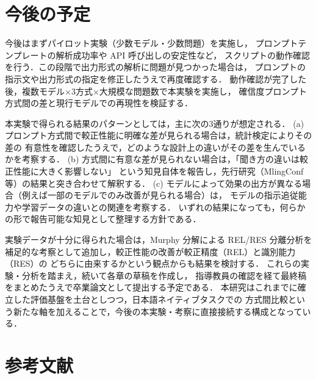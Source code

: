 \documentclass[10pt,a4paper,twocolumn]{article}
\begin{document}
\section{今後の予定}

今後はまずパイロット実験（少数モデル・少数問題）を実施し，
プロンプトテンプレートの解析成功率や API 呼び出しの安定性など，
スクリプトの動作確認を行う．この段階で出力形式の解析に問題が見つかった場合は，
プロンプトの指示文や出力形式の指定を修正したうえで再度確認する．
動作確認が完了した後，複数モデル×3方式×大規模な問題数で本実験を実施し，
確信度プロンプト方式間の差と現行モデルでの再現性を検証する．

本実験で得られる結果のパターンとしては，主に次の3通りが想定される．
(a) プロンプト方式間で較正性能に明確な差が見られる場合は，統計検定によりその差の
有意性を確認したうえで，どのような設計上の違いがその差を生んでいるかを考察する．
(b) 方式間に有意な差が見られない場合は，「聞き方の違いは較正性能に大きく影響しない」
という知見自体を報告し，先行研究（MlingConf 等）の結果と突き合わせて解釈する．
(c) モデルによって効果の出方が異なる場合（例えば一部のモデルでのみ改善が見られる場合）は，
モデルの指示追従能力や学習データの違いとの関連を考察する．
いずれの結果になっても，何らかの形で報告可能な知見として整理する方針である．

実験データが十分に得られた場合は，Murphy 分解による REL/RES 分離分析を
補足的な考察として追加し，較正性能の改善が較正精度（REL）と識別能力（RES）の
どちらに由来するかという観点からも結果を検討する．
これらの実験・分析を踏まえ，続いて各章の草稿を作成し，
指導教員の確認を経て最終稿をまとめたうえで卒業論文として提出する予定である．
本研究はこれまでに確立した評価基盤を土台としつつ，日本語ネイティブタスクでの
方式間比較という新たな軸を加えることで，今後の本実験・考察に直接接続する構成となっている．

\section*{参考文献}
\end{document}

